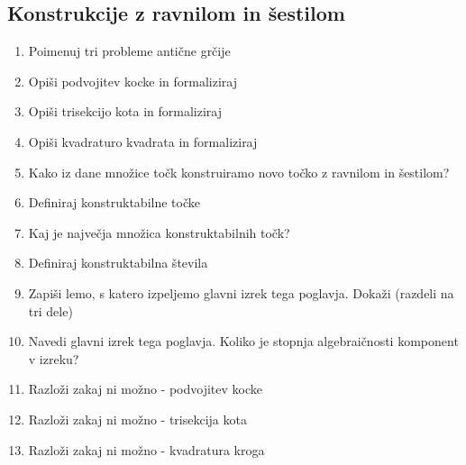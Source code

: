 \documentclass{article}
\begin{document}
    \subsection{Konstrukcije z ravnilom in šestilom}
    \begin{enumerate}
        \item Poimenuj tri probleme antične grčije
        \item Opiši podvojitev kocke in formaliziraj
        \item Opiši trisekcijo kota in formaliziraj
        \item Opiši kvadraturo kvadrata in formaliziraj
        \item Kako iz dane množice točk konstruiramo novo točko z ravnilom in šestilom?
        \item Definiraj konstruktabilne točke
        \item Kaj je največja množica konstruktabilnih točk?
        \item Definiraj konstruktabilna števila
        \item Zapiši lemo, s katero izpeljemo glavni izrek tega poglavja. Dokaži (razdeli na tri dele)
        \item Navedi glavni izrek tega poglavja. Koliko je stopnja algebraičnosti komponent v izreku?
        \item Razloži zakaj ni možno - podvojitev kocke
        \item Razloži zakaj ni možno - trisekcija kota
        \item Razloži zakaj ni možno - kvadratura kroga
    \end{enumerate}
\end{document}
